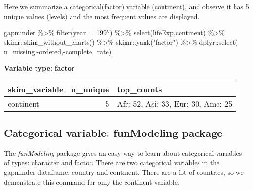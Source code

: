 \documentclass[
]{book}
\newenvironment{Shaded}{\begin{snugshade}}{\end{snugshade}}
\newcommand{\CommentTok}[1]{\textcolor[rgb]{0.56,0.35,0.01}{\textit{#1}}}
\newcommand{\DecValTok}[1]{\textcolor[rgb]{0.00,0.00,0.81}{#1}}
\newcommand{\FunctionTok}[1]{\textcolor[rgb]{0.00,0.00,0.00}{#1}}
\newcommand{\NormalTok}[1]{#1}
\newcommand{\SpecialCharTok}[1]{\textcolor[rgb]{0.00,0.00,0.00}{#1}}
\newcommand{\StringTok}[1]{\textcolor[rgb]{0.31,0.60,0.02}{#1}}
\begin{document}
Here we summarize a categorical(factor) variable (continent), and observe it has 5 unique values (levels) and the most frequent values are displayed.

\begin{Shaded}
\begin{Highlighting}[]
\NormalTok{gapminder }\SpecialCharTok{\%\textgreater{}\%} \FunctionTok{filter}\NormalTok{(year}\SpecialCharTok{==}\DecValTok{1997}\NormalTok{) }\SpecialCharTok{\%\textgreater{}\%} 
  \FunctionTok{select}\NormalTok{(lifeExp,continent) }\SpecialCharTok{\%\textgreater{}\%} 
\NormalTok{  skimr}\SpecialCharTok{::}\FunctionTok{skim\_without\_charts}\NormalTok{() }\SpecialCharTok{\%\textgreater{}\%}
\NormalTok{  skimr}\SpecialCharTok{::}\FunctionTok{yank}\NormalTok{(}\StringTok{"factor"}\NormalTok{) }\SpecialCharTok{\%\textgreater{}\%}
\NormalTok{  dplyr}\SpecialCharTok{::}\FunctionTok{select}\NormalTok{(}\SpecialCharTok{{-}}\NormalTok{n\_missing,}\SpecialCharTok{{-}}\NormalTok{ordered,}\SpecialCharTok{{-}}\NormalTok{complete\_rate)}
\end{Highlighting}
\end{Shaded}

\textbf{Variable type: factor}

\begin{tabular}{l|r|l}
\hline
skim\_variable & n\_unique & top\_counts\\
\hline
continent & 5 & Afr: 52, Asi: 33, Eur: 30, Ame: 25\\
\hline
\end{tabular}

\hypertarget{categorical-variable-funmodeling-package}{%
\subsection{Categorical variable: funModeling package}\label{categorical-variable-funmodeling-package}}

The \emph{funModeling} package gives an easy way to learn about categorical variables of types: character and factor. There are two categorical variables in the gapminder
dataframe: country and continent. There are a lot of countries, so we demonstrate
this command for only the continent variable.

\begin{Shaded}
\end{Shaded}
\end{document}

